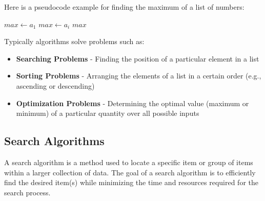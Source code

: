 \begin{eg}
    Here is a pseudocode example for finding the maximum of a list of numbers:
    \begin{algorithmic}
            \State $max \gets a_1$
                    \State $max \gets a_i$
                \EndIf
            \EndFor
            \State \Return $max$
        \EndFunction
    \end{algorithmic}
\end{eg}
Typically algorithms solve problems such as:
\begin{itemize}[itemsep=1pt,label=$\circ$]
    \item \textbf{Searching Problems} - Finding the position of a particular element in a list
    \item \textbf{Sorting Problems} - Arranging the elements of a list in a certain order (e.g., ascending or descending)
    \item \textbf{Optimization Problems} - Determining the optimal value (maximum or minimum) of a particular quantity over all possible inputs
\end{itemize}

\subsection{Search Algorithms}
\begin{definition}
    A search algorithm is a method used to locate a specific item or group of items within a larger collection of data. The goal of a search algorithm is to efficiently find the desired item(s) while minimizing the time and resources required for the search process.
\end{definition}

